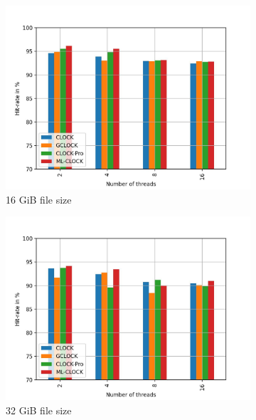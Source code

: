 \documentclass[
	12pt,
	a4paper,
	abstract,
	bibliography=totoc,
	chapterprefix,
	headings=openright,
	numbers=endperiod,
	parskip=half,
	twoside,
]{scrreprt}
\begin{document}
\begin{figure}[H]
	\centering
	\begin{subfigure}{0.4\textwidth}
		\includegraphics[width=\textwidth]{multi_16_gb_rw_50to50_zipf.jpg}		
		\caption{16 GiB file size}
		\label{fig:rw_50to50 16 zipf}
	\end{subfigure}
	\hfill
	\begin{subfigure}{0.4\textwidth}
		\includegraphics[width=\textwidth]{multi_32_gb_rw_50to50_zipf.jpg}		
		\caption{32 GiB file size}
		\label{fig:rw_50to50 32 zipf}
	\end{subfigure}
	\hfill
	\begin{subfigure}{0.4\textwidth}

\end{subfigure}
\end{figure}
\end{document}
